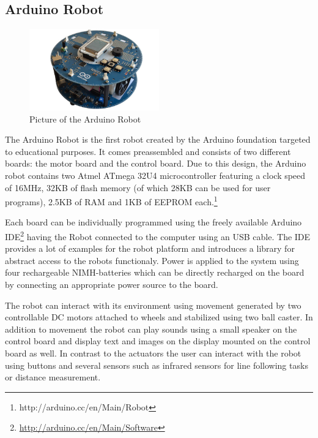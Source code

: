 \documentclass[11pt,a4paper]{article}
\begin{document}
\subsection{Arduino Robot}
\begin{figure}[H]
  \centering
  \includegraphics[width=0.5\textwidth]{images/arduinorobot.jpg}
  \caption{Picture of the Arduino Robot}
\end{figure}

The Arduino Robot is the first robot created by the Arduino foundation targeted to educational purposes. It comes preassembled and consists of two different boards: the motor board and the control board. Due to this design, the Arduino robot contains two Atmel ATmega 32U4 microcontroller featuring a clock speed of 16MHz, 32KB of flash memory (of which 28KB can be used for user programs), 2.5KB of RAM and 1KB of EEPROM each.\footnote{{http://arduino.cc/en/Main/Robot}}

Each board can be individually programmed using the freely available Arduino IDE\footnote{\url{http://arduino.cc/en/Main/Software}} having the Robot connected to the computer using an USB cable. The IDE provides a lot of examples for the robot platform and introduces a library for abstract access to the robots functionaly. Power is applied to the system using four rechargeable NIMH-batteries which can be directly recharged on the board by connecting an appropriate power source to the board.

The robot can interact with its environment using movement generated by two controllable DC motors attached to wheels and stabilized using two ball caster. In addition to movement the robot can play sounds using a small speaker on the control board and display text and images on the display mounted on the control board as well. In contrast to the actuators the user can interact with the robot using buttons and several sensors such as infrared sensors for line following tasks or distance measurement.
\end{document}
